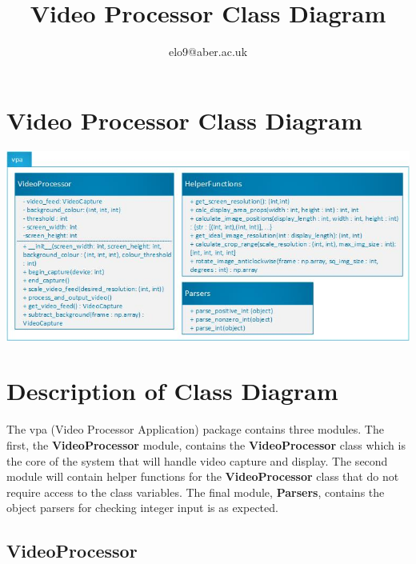 \documentclass{article}
\title{Video Processor Class Diagram}
\author{elo9@aber.ac.uk}
\begin{document}
\maketitle
\tableofcontents

\newpage

\section{Video Processor Class Diagram}
\includegraphics[width=\textwidth]{VideoProcessorClassDiagramImage}


\section{Description of Class Diagram}
The vpa (Video Processor Application) package contains three modules. The first, the \textbf{VideoProcessor} module, contains the \textbf{VideoProcessor} class which is the core of the system that will handle video capture and display. The second module will contain helper functions for the \textbf{VideoProcessor} class that do not require access to the class variables. The final module, \textbf{Parsers}, contains the object parsers for checking integer input is as expected.

\subsection{VideoProcessor}
\end{document}
